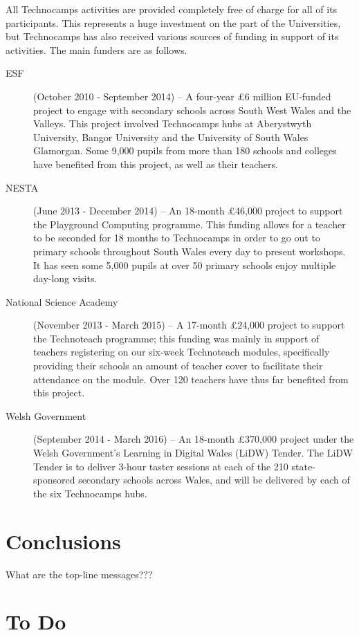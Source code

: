 \documentclass{sig-alternate}
\begin{document}
All Technocamps activities are provided completely free of charge
for all of its participants. This represents a huge investment
on the part of the Universities, but Technocamps has also received
various sources of funding in support of its activities.
The main funders are as follows.
\begin{description}
\item[ESF] (October 2010 - September 2014) --
A four-year \pounds 6 million EU-funded project to engage with secondary schools across South West Wales and the Valleys. This project involved Technocamps hubs at Aberystwyth University, Bangor University and the University of South Wales Glamorgan. Some 9,000 pupils from more than 180 schools and colleges have benefited from this project, as well as their teachers.
\item[NESTA] (June 2013 - December 2014) --
An 18-month \pounds 46,000 project to support the Playground Computing programme. This funding allows for a teacher to be seconded for 18 months to Technocamps in order to go out to primary schools throughout South Wales every day to present workshops. It has seen some 5,000 pupils at over 50 primary schools enjoy multiple day-long visits.
\item[National Science Academy] (November 2013 - March 2015) --
A 17-month \pounds 24,000 project to support the Technoteach programme; this funding was mainly in support of teachers registering on our six-week Technoteach modules, specifically providing their schools an amount of teacher cover to facilitate their attendance on the module. Over 120 teachers have thus far benefited from this project.
\item[Welsh Government] (September 2014 - March 2016) --
An 18-month \pounds 370,000 project under the Welsh Government's Learning in Digital Wales (LiDW) Tender. The LiDW Tender is to deliver 3-hour taster sessions at each of the 210 state-sponsored secondary schools across Wales, and will be delivered by each of the six Technocamps hubs.
\end{description}

\section{Conclusions}
What are the top-line messages???





\section*{To Do}
\end{document}
